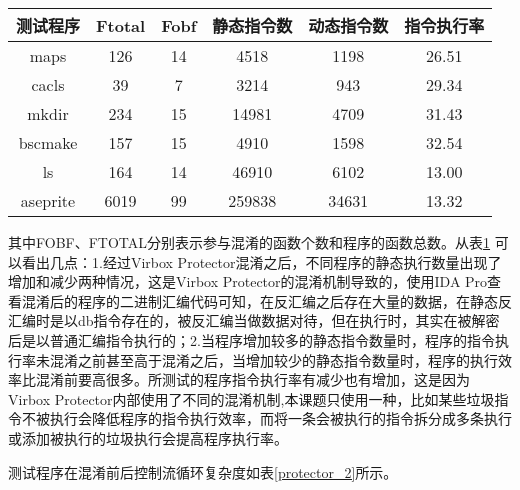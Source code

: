 \begin{table}[htbp]
	\centering
	\begin{tabular}{cccccc}
		\bottomrule[1.5pt]
		测试程序     & Ftotal & Fobf & 静态指令数  & 动态指令数 & 指令执行率 \\ \hline
		maps     & 126    & 14   & 4518   & 1198  & 26.51 \\
		cacls    & 39     & 7    & 3214   & 943   & 29.34 \\
		mkdir    & 234    & 15   & 14981  & 4709  & 31.43 \\
		bscmake  & 157    & 15   & 4910   & 1598  & 32.54 \\
		ls       & 164    & 14   & 46910  & 6102  & 13.00 \\
		aseprite & 6019   & 99   & 259838 & 34631 & 13.32 \\ 
		\toprule[1.5pt]
	\end{tabular}

	\label{Virbox}
\end{table}
其中FOBF、FTOTAL分别表示参与混淆的函数个数和程序的函数总数。从表\ref{Virbox} 可以看出几点：1.经过Virbox Protector混淆之后，不同程序的静态执行数量出现了增加和减少两种情况，这是Virbox Protector的混淆机制导致的，使用IDA Pro查看混淆后的程序的二进制汇编代码可知，在反汇编之后存在大量的数据，在静态反汇编时是以db指令存在的，被反汇编当做数据对待，但在执行时，其实在被解密后是以普通汇编指令执行的；2.当程序增加较多的静态指令数量时，程序的指令执行率未混淆之前甚至高于混淆之后，当增加较少的静态指令数量时，程序的执行效率比混淆前要高很多。所测试的程序指令执行率有减少也有增加，这是因为Virbox Protector内部使用了不同的混淆机制,本课题只使用一种，比如某些垃圾指令不被执行会降低程序的指令执行效率，而将一条会被执行的指令拆分成多条执行或添加被执行的垃圾执行会提高程序执行率。

测试程序在混淆前后控制流循环复杂度如表\ref{protector_2}所示。

